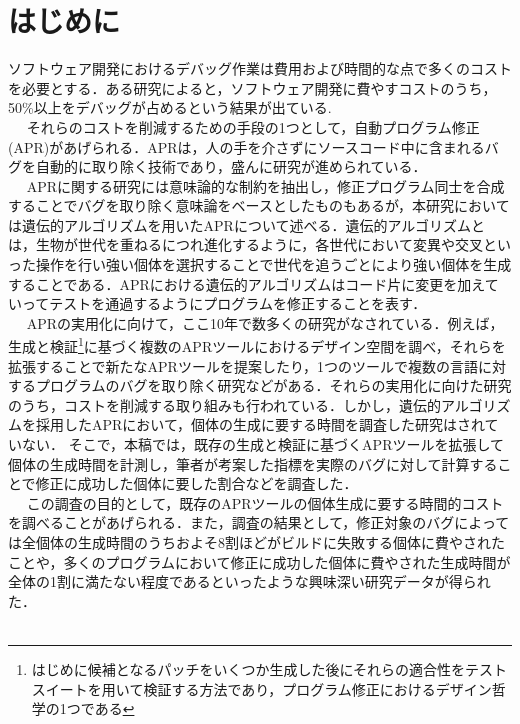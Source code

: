 \documentclass[uplatex,dvipdfmx,a4paper]{jsarticle}
\let\oldcite\cite
\renewcommand{\cite}[1]{\xspace\oldcite{#1}}
\begin{document}
\section{はじめに}\label{sec:intro}
ソフトウェア開発におけるデバッグ作業は費用および時間的な点で多くのコストを必要とする．ある研究によると，ソフトウェア開発に費やすコストのうち，50\%以上をデバッグが占めるという結果が出ている\cite{5386906, Britton_reversibledebugging}.\\　
それらのコストを削減するための手段の1つとして，自動プログラム修正(APR)があげられる．APRは，人の手を介さずにソースコード中に含まれるバグを自動的に取り除く技術であり，盛んに研究が進められている\cite{gazzola2018automatic, goues2019automated}．\\　
APRに関する研究には意味論的な制約を抽出し，修正プログラム同士を合成することでバグを取り除く意味論をベースとしたものもある\cite{le2018overfitting}が，本研究においては遺伝的アルゴリズムを用いたAPRについて述べる．遺伝的アルゴリズムとは，生物が世代を重ねるにつれ進化するように，各世代において変異や交叉といった操作を行い強い個体を選択することで世代を追うごとにより強い個体を生成することである．APRにおける遺伝的アルゴリズムはコード片に変更を加えていってテストを通過するようにプログラムを修正することを表す．\\　
APRの実用化に向けて，ここ10年で数多くの研究がなされている．例えば，生成と検証\footnote{はじめに候補となるパッチをいくつか生成した後にそれらの適合性をテストスイートを用いて検証する方法であり，プログラム修正におけるデザイン哲学の1つである\cite{martinez2019astor}}に基づく複数のAPRツールにおけるデザイン空間を調べ，それらを拡張することで新たなAPRツールを提案したり\cite{martinez2019astor}，1つのツールで複数の言語に対するプログラムのバグを取り除く研究\cite{lin2017quixbugs}などがある．それらの実用化に向けた研究のうち，コストを削減する取り組みも行われている\cite{id692,qi2013efficient}．しかし，遺伝的アルゴリズムを採用したAPRにおいて，個体の生成に要する時間を調査した研究はされていない．
そこで，本稿では，既存の生成と検証に基づくAPRツールを拡張して個体の生成時間を計測し，筆者が考案した指標を実際のバグに対して計算することで修正に成功した個体に要した割合などを調査した．\\　
この調査の目的として，既存のAPRツールの個体生成に要する時間的コストを調べることがあげられる．また，調査の結果として，修正対象のバグによっては全個体の生成時間のうちおよそ8割ほどがビルドに失敗する個体に費やされたことや，多くのプログラムにおいて修正に成功した個体に費やされた生成時間が全体の1割に満たない程度であるといったような興味深い研究データが得られた．\\　
\end{document}
